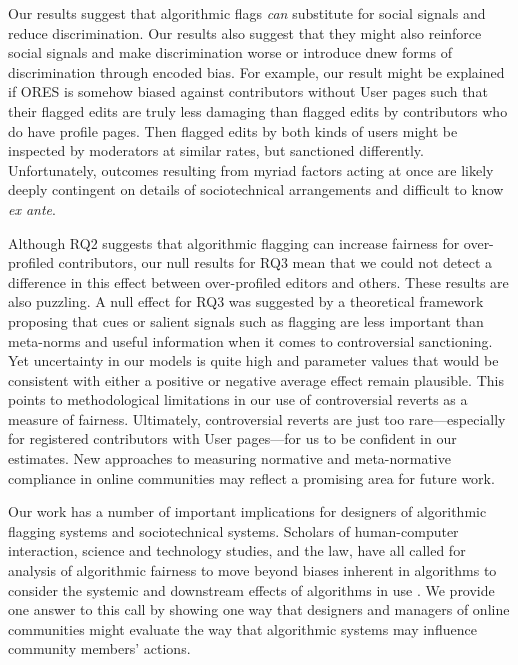 \documentclass[format=acmsmall, natbib=true,  screen=true]{acmart}
\begin{document}
Our results suggest that algorithmic flags \textit{can} substitute for social signals and reduce discrimination. Our results also suggest that they might also reinforce social signals and make discrimination worse or  introduce dnew forms of discrimination through encoded bias. For example, our result might be explained if ORES is somehow biased against contributors without User pages such that their flagged edits are truly less damaging than flagged edits by contributors who do have profile pages. Then flagged edits by both kinds of users might be inspected by moderators at similar rates, but sanctioned differently.  Unfortunately, outcomes resulting from myriad factors acting at once
are likely deeply contingent on details of sociotechnical arrangements and difficult to know \textit{ex ante}.

Although RQ2 suggests that algorithmic flagging can increase fairness for over-profiled contributors, our null results for RQ3 mean that we could not detect a difference in this effect between over-profiled editors and others.  These results are also puzzling.  A null effect for RQ3 was suggested by a theoretical framework proposing that cues or salient signals such as flagging are less important than meta-norms and useful information when it comes to controversial sanctioning.  Yet uncertainty in our models is quite high and parameter values that would be consistent with either a positive or negative average effect remain plausible. This points to methodological limitations in our use of controversial reverts as a measure of fairness. Ultimately, controversial reverts are just too rare---especially for registered contributors with User pages---for us to be confident in our estimates. 
New approaches to measuring normative and meta-normative compliance in online communities may reflect a promising area for future work.


Our work has a number of important implications for designers of algorithmic flagging systems and sociotechnical systems.
Scholars of human-computer interaction, science and technology studies, and the law, have all called for analysis of algorithmic fairness to move beyond biases inherent in algorithms to consider the systemic and downstream effects of algorithms in use \cite{selbst_fairness_2019, stevenson_assessing_2017, zhu_value-sensitive_2018}. We provide one answer to this call by showing one way that designers and managers of online communities might evaluate the way that algorithmic systems may influence community members' actions.
\end{document}
